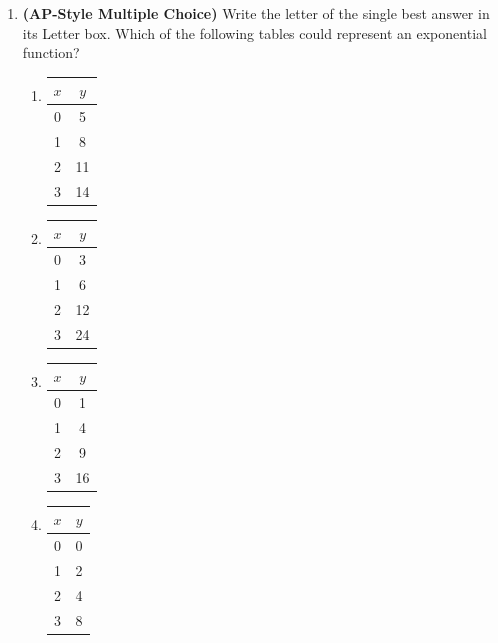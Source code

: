 \documentclass[10pt]{article}
\begin{document}
\begin{enumerate}[itemsep=16pt]
\begin{enumerate}[label=(\alph*), itemsep=8pt]
        \item Calculate $A(12)$ and $B(12)$. Which plan gives a higher balance after 12 months?

              \vspace{0.06in}
              $A(12) = \$$ \smash{\gradedblank[id=hw4c1, type=short, points=1, answer={1100}]{3cm}{13pt}} \quad $B(12) \approx \$$ \smash{\gradedblank[id=hw4c2, type=short, check=numeric, tolerance=0.005, points=2, answer={897.93}]{3cm}{13pt}}

              \vspace{0.04in}
              Higher balance: \smash{\gradedblank[id=hw4c3, type=short, check=text, points=1, answer={Plan A}]{4cm}{13pt}}
      \end{enumerate}

\newpage
\item \textbf{(AP-Style Multiple Choice)} Write the letter of the single best answer in its Letter box. Which of the following tables could represent an
      exponential function?

      \medskip
      \begin{enumerate}[label=(\Alph*), itemsep=4pt]
        \item
        \begin{tabular}{c|c}
          $x$ & $y$ \\ \hline 0 & 5 \\ 1 & 8 \\ 2 & 11 \\ 3 & 14
        \end{tabular}

        \item
        \begin{tabular}{c|c}
          $x$ & $y$ \\ \hline 0 & 3 \\ 1 & 6 \\ 2 & 12 \\ 3 & 24
        \end{tabular}

        \item
        \begin{tabular}{c|c}
          $x$ & $y$ \\ \hline 0 & 1 \\ 1 & 4 \\ 2 & 9 \\ 3 & 16
        \end{tabular}

        \item
        \begin{tabular}{c|c}
          $x$ & $y$ \\ \hline 0 & 0 \\ 1 & 2 \\ 2 & 4 \\ 3 & 8
        \end{tabular}
      \end{enumerate}


\end{enumerate}
\end{document}
